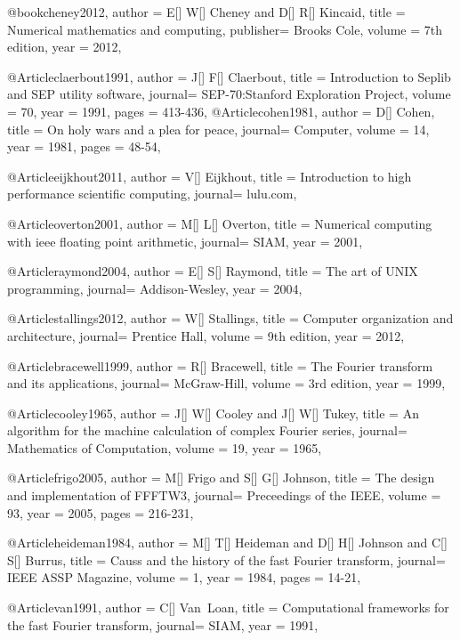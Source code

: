 {@book{cheney2012,
  author = 	 {E[] W[] Cheney and D[] R[] Kincaid},
  title  = 	 {Numerical mathematics and computing},
  publisher= 	 {Brooks Cole},
  volume =	 {7th edition},
  year   = 	 2012,
}

@Article{claerbout1991,
  author = 	 {J[] F[] Claerbout},
  title  = 	 {Introduction to Seplib and SEP utility software},
  journal= 	 {SEP-70:Stanford Exploration Project},
  volume =	 {70},
  year   = 	 1991,
  pages  =	 413-436,
}
@Article{cohen1981,
  author = 	 {D[] Cohen},
  title  = 	 {On holy wars and a plea for peace},
  journal= 	 {Computer},
  volume =	 {14},
  year   = 	 1981,
  pages  =   	 48-54,
}

@Article{eijkhout2011,
  author = 	 {V[] Eijkhout},
  title  = 	 {Introduction to high performance scientific computing},
  journal= 	 {lulu.com},
}

@Article{overton2001,
  author = 	 {M[] L[] Overton},
  title  = 	 {Numerical computing with ieee floating point arithmetic},
  journal= 	 {SIAM},
  year   = 	 2001,
}

@Article{raymond2004,
  author = 	 {E[] S[] Raymond},
  title  = 	 {The art of UNIX programming},
  journal= 	 {Addison-Wesley},
  year   = 	 2004,
}

@Article{stallings2012,
  author = 	 {W[] Stallings},
  title  = 	 {Computer organization and architecture},
  journal= 	 {Prentice Hall},
  volume =	 {9th edition},
  year   = 	 2012,
}

@Article{bracewell1999,
  author = 	 {R[] Bracewell},
  title  = 	 {The Fourier transform and its applications},
  journal= 	 {McGraw-Hill},
  volume =	 {3rd edition},
  year   = 	 1999,
}

@Article{cooley1965,
  author = 	 {J[] W[] Cooley and J[] W[] Tukey},
  title  = 	 {An algorithm for the machine calculation of complex Fourier series},
  journal= 	 {Mathematics of Computation},
  volume =	 {19},
  year   = 	 1965,
}

@Article{frigo2005,
  author = 	 {M[] Frigo and S[] G[] Johnson},
  title  = 	 {The design and implementation of FFFTW3},
  journal= 	 {Preceedings of the IEEE},
  volume =	 {93},
  year   = 	 2005,
  pages = 216-231,
}

@Article{heideman1984,
  author = 	 {M[] T[] Heideman and D[] H[] Johnson and C[] S[] Burrus},
  title  = 	 {Causs and the history of the fast Fourier transform},
  journal= 	 {IEEE ASSP Magazine},
  volume =	 {1},
  year   = 	 1984,
  pages = 14-21,
}

@Article{van1991,
  author = 	 {C[] Van~Loan},
  title  = 	 {Computational frameworks for the fast Fourier transform},
  journal= 	 {SIAM},
  year   = 	 1991,
}

}
